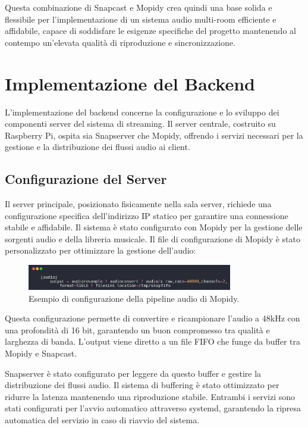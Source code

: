 Questa combinazione di Snapcast e Mopidy crea quindi una base solida e flessibile per l'implementazione di un sistema audio multi-room efficiente e affidabile, capace di soddisfare le esigenze specifiche del progetto mantenendo al contempo un'elevata qualità di riproduzione e sincronizzazione.

\section{Implementazione del Backend}
\noindent


L'implementazione del backend concerne la configurazione e lo sviluppo dei componenti server del sistema di streaming. Il server centrale, costruito su Raspberry Pi, ospita sia Snapserver che Mopidy, offrendo i servizi necessari per la gestione e la distribuzione dei flussi audio ai client.

\subsection{Configurazione del Server}

Il server principale, posizionato fisicamente nella sala server, richiede una configurazione specifica dell'indirizzo IP statico per garantire una connessione stabile e affidabile. Il sistema è stato configurato con Mopidy per la gestione delle sorgenti audio e della libreria musicale. Il file di configurazione di Mopidy è stato personalizzato per ottimizzare la gestione dell'audio:

\begin{figure}[H]
    \centering
    \includegraphics[width=0.8\textwidth]{Chapters/Figures/snap_code_audio.png}
    \caption{\small Esempio di configurazione della pipeline audio di Mopidy.} 
    \label{fig:snap_code_audio}
\end{figure}

Questa configurazione permette di convertire e ricampionare l'audio a 48kHz con una profondità di 16 bit, garantendo un buon compromesso tra qualità e larghezza di banda. L'output viene diretto a un file FIFO che funge da buffer tra Mopidy e Snapcast.

Snapserver è stato configurato per leggere da questo buffer e gestire la distribuzione dei flussi audio. Il sistema di buffering è stato ottimizzato per ridurre la latenza mantenendo una riproduzione stabile. Entrambi i servizi sono stati configurati per l'avvio automatico attraverso systemd, garantendo la ripresa automatica del servizio in caso di riavvio del sistema.

